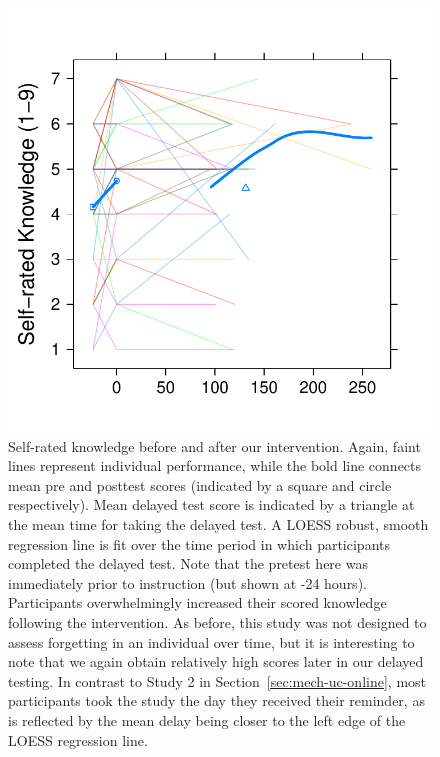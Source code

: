 \begin{figure}
    \centering
    \includegraphics{CCO-mech-self.pdf}
    \caption{Self-rated knowledge before and after our intervention. Again,
        faint lines represent individual performance, while the bold line
        connects mean pre and posttest scores (indicated by a square and circle
        respectively).  Mean delayed test score is indicated by a triangle at
        the mean time for taking the delayed test. A LOESS robust, smooth
        regression line is fit over the time period in which participants
        completed the delayed test.  Note that the pretest here was immediately
        prior to instruction (but shown at -24 hours). Participants
        overwhelmingly increased their scored knowledge following the
        intervention. As before, this study was not designed to assess
        forgetting in an individual over time, but it is interesting to note
        that we again obtain relatively high scores later in our delayed
        testing. In contrast to Study 2 in Section~\ref{sec:mech-uc-online},
        most participants took the study the day they received their reminder,
        as is reflected by the mean delay being closer to the left edge of the
        LOESS regression line.}
    \label{fig:CCO-mech-self}
\end{figure}

